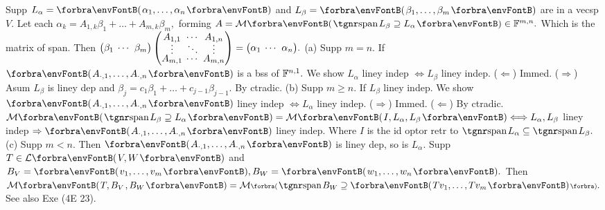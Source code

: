 
\vspace{8pt}

\BulletPointX\NoteFor{[3.30, 32]}\;\TextB{}
Supp $L_{\alpha}=\Par{\alpha_1,\dots,\alpha_n}$ and $L_{\beta}=\Par{\beta_1,\dots,\beta_m}$ are in a vecsp $V.$\TextB{}
Let each $\alpha_k=A_{1,k}\beta_1+\dots+A_{m,k}\beta_m,$ forming $A=\Mt{\spn L_\beta\supseteq L_{\alpha}}\in\Fbb^{m,n}.$\TextB{\vspace{3pt}}
Which is {\tgsl the matrix of span}. \;Then ${\normalsize\begin{pmatrix}\beta_1 &\hspace{-6pt} \cdots &\hspace{-6pt} \beta_m\end{pmatrix}\begin{pmatrix}
	A_{1,1} &\hspace{-6pt} \cdots &\hspace{-6pt} A_{1,n}\\[-4pt]
	\vdots	&\hspace{-6pt} \ddots &\hspace{-6pt} \vdots \\[-4pt]
	A_{m,1} &\hspace{-6pt} \cdots &\hspace{-6pt} A_{m,n}
\end{pmatrix}}={\normalsize\begin{pmatrix}\alpha_1 &\hspace{-6pt} \cdots &\hspace{-6pt} \alpha_n\end{pmatrix}}.$\TextB{\vspace{6pt}}
(a) Supp $m=n.$ If $\Par{A_{\cdot,1},\dots,A_{\cdot,n}}$ is a bss of ${\mathbb{F}}^{n,1}.$ We show $L_{\alpha}$ liney indep $\Longleftrightarrow L_{\beta}$ liney indep.\TextB{}
\Ha ($\Leftarrow$) Immed. ($\Rightarrow$) Asum $L_{\beta}$ is liney dep and $\beta_j=c_1\beta_1+\dots+c_{j-1}\beta_{j-1}.$ By ctradic.\PfEnd\vspace{2pt}\TextB{}
(b) Supp $m\geqslant n.$ If $L_{\beta}$ liney indep. We show $\Par{A_{\cdot,1},\dots,A_{\cdot,n}}$ liney indep $\Longleftrightarrow L_{\alpha}$ liney indep.\TextB{}
\Hb ($\Rightarrow$) Immed. ($\Leftarrow$) By ctradic.\PfEnd\TextB{}
\Hb\ANote $\Mt{\spn L_{\beta}\supseteq L_\alpha}=\Mt{I,L_{\alpha},L_{\beta}}\Longleftrightarrow L_{\alpha},L_{\beta}$ liney indep $\Rightarrow\Par{A_{\cdot,1},\dots,A_{\cdot,n}}$ liney indep.\parNot{\Hb\IndentB}
Where $I$ is the id optor retr to $\spn L_{\alpha}\subseteq\spn L_{\beta}.$
\vspace{3pt}\TextB{}
(c) Supp $m<n.$ Then $\Par{A_{\cdot,1},\dots,A_{\cdot,n}}$ is liney dep, so is $L_{\alpha}.$\TextB{\vspace{5pt}}
Supp $T\in\Lm{V,W}$ and $B_V=\Par{v_1,\dots,v_m},B_W=\Par{w_1,\dots,w_n}.$\TextB{}
Then $\Mt{T,B_V\hspace{1pt},B_W}=\Mt[\BigPar]{\spn B_W\supseteq\Par{Tv_1,\dots,Tv_m}}.$ \;See also Exe (4E 23).
\SepLine

